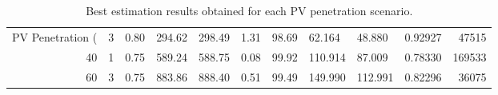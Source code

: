 \begin{table}
\caption{Best estimation results obtained for each PV penetration scenario.}
\label{tab:best_results}
\begin{tabular}{rrllllllllr}
\toprule
PV Penetration (%
\midrule
20 & 3 & 0.80 & 294.62 & 298.49 & 1.31 & 98.69 & 62.164 & 48.880 & 0.92927 & 47515 \\
40 & 1 & 0.75 & 589.24 & 588.75 & 0.08 & 99.92 & 110.914 & 87.009 & 0.78330 & 169533 \\
60 & 3 & 0.75 & 883.86 & 888.40 & 0.51 & 99.49 & 149.990 & 112.991 & 0.82296 & 36075 \\
\bottomrule
\end{tabular}
\end{table}
